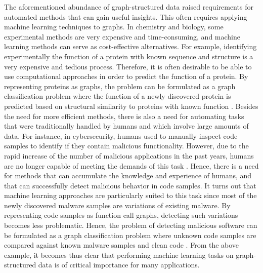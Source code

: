 \documentclass[twoside,11pt]{article}
\begin{document}
The aforementioned abundance of graph-structured data raised requirements for automated methods that can gain useful insights.
This often requires applying machine learning techniques to graphs.
In chemistry and biology, some experimental methods are very expensive and time-consuming, and machine learning methods can serve as cost-effective alternatives.
For example, identifying experimentally the function of a protein with known sequence and structure is a very expensive and tedious process.
Therefore, it is often desirable to be able to use computational approaches in order to predict the function of a protein.
By representing proteins as graphs, the problem can be formulated as a graph classification problem where the function of a newly discovered protein is predicted based on structural similarity to proteins with known function \cite{borgwardt2005protein}.
Besides the need for more efficient methods, there is also a need for automating tasks that were traditionally handled by humans and which involve large amounts of data.
For instance, in cybersecurity, humans used to manually inspect code samples to identify if they contain malicious functionality.
However, due to the rapid increase of the number of malicious applications in the past years, humans are no longer capable of meeting the demands of this task \cite{suarez2014evolution}.
Hence, there is a need for methods that can accumulate the knowledge and experience of humans, and that can successfully detect malicious behavior in code samples.
It turns out that machine learning approaches are particularly suited to this task since most of the newly discovered malware samples are variations of existing malware.
By representing code samples as function call graphs, detecting such variations becomes less problematic.
Hence, the problem of detecting malicious software can be formulated as a graph classification problem where unknown code samples are compared against known malware samples and clean code \cite{anderson2011graph}.
From the above example, it becomes thus clear that performing machine learning tasks on graph-structured data is of critical importance for many applications. 
\end{document}
